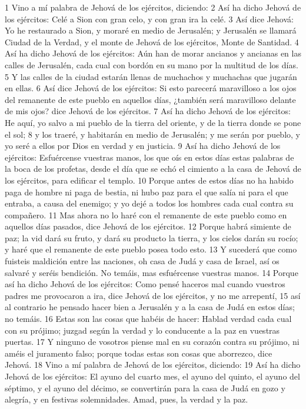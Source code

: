1 Vino a mí palabra de Jehová de los ejércitos, diciendo:
2 Así ha dicho Jehová de los ejércitos: Celé a Sion con gran celo, y con gran ira la celé.
3 Así dice Jehová: Yo he restaurado a Sion, y moraré en medio de Jerusalén; y Jerusalén se llamará Ciudad de la Verdad, y el monte de Jehová de los ejércitos, Monte de Santidad.
4 Así ha dicho Jehová de los ejércitos: Aún han de morar ancianos y ancianas en las calles de Jerusalén, cada cual con bordón en su mano por la multitud de los días.
5 Y las calles de la ciudad estarán llenas de muchachos y muchachas que jugarán en ellas.
6 Así dice Jehová de los ejércitos: Si esto parecerá maravilloso a los ojos del remanente de este pueblo en aquellos días, ¿también será maravilloso delante de mis ojos? dice Jehová de los ejércitos.
7 Así ha dicho Jehová de los ejércitos: He aquí, yo salvo a mi pueblo de la tierra del oriente, y de la tierra donde se pone el sol;
8 y los traeré, y habitarán en medio de Jerusalén; y me serán por pueblo, y yo seré a ellos por Dios en verdad y en justicia.
9 Así ha dicho Jehová de los ejércitos: Esfuércense vuestras manos, los que oís en estos días estas palabras de la boca de los profetas, desde el día que se echó el cimiento a la casa de Jehová de los ejércitos, para edificar el templo.
10 Porque antes de estos días no ha habido paga de hombre ni paga de bestia, ni hubo paz para el que salía ni para el que entraba, a causa del enemigo; y yo dejé a todos los hombres cada cual contra su compañero.
11 Mas ahora no lo haré con el remanente de este pueblo como en aquellos días pasados, dice Jehová de los ejércitos.
12 Porque habrá simiente de paz; la vid dará su fruto, y dará su producto la tierra, y los cielos darán su rocío; y haré que el remanente de este pueblo posea todo esto.
13 Y sucederá que como fuisteis maldición entre las naciones, oh casa de Judá y casa de Israel, así os salvaré y seréis bendición. No temáis, mas esfuércense vuestras manos.
14 Porque así ha dicho Jehová de los ejércitos: Como pensé haceros mal cuando vuestros padres me provocaron a ira, dice Jehová de los ejércitos, y no me arrepentí,
15 así al contrario he pensado hacer bien a Jerusalén y a la casa de Judá en estos días; no temáis.
16 Estas son las cosas que habéis de hacer: Hablad verdad cada cual con su prójimo; juzgad según la verdad y lo conducente a la paz en vuestras puertas.
17 Y ninguno de vosotros piense mal en su corazón contra su prójimo, ni améis el juramento falso; porque todas estas son cosas que aborrezco, dice Jehová.
18 Vino a mí palabra de Jehová de los ejércitos, diciendo:
19 Así ha dicho Jehová de los ejércitos: El ayuno del cuarto mes, el ayuno del quinto, el ayuno del séptimo, y el ayuno del décimo, se convertirán para la casa de Judá en gozo y alegría, y en festivas solemnidades. Amad, pues, la verdad y la paz.
